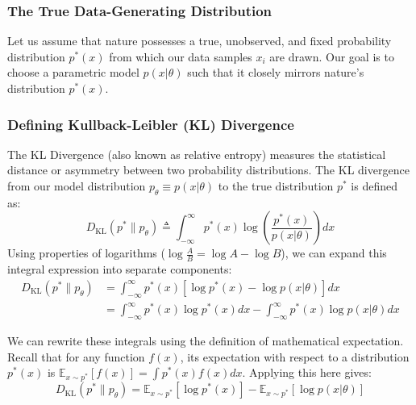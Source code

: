 \documentclass{article}
\begin{document}
\subsubsection{The True Data-Generating Distribution}
Let us assume that nature possesses a true, unobserved, and fixed probability distribution $p^*(x)$ from which our data samples $x_i$ are drawn. Our goal is to choose a parametric model $p(x|\theta)$ such that it closely mirrors nature's distribution $p^*(x)$.

\subsubsection{Defining Kullback-Leibler (KL) Divergence}
The KL Divergence (also known as relative entropy) measures the statistical distance or asymmetry between two probability distributions. The KL divergence from our model distribution $p_\theta \equiv p(x|\theta)$ to the true distribution $p^*$ is defined as:
\begin{equation}
D_{\text{KL}}(p^* \parallel p_\theta) \triangleq \int_{-\infty}^{\infty} p^*(x) \log \left( \frac{p^*(x)}{p(x|\theta)} \right) dx
\end{equation}
Using properties of logarithms ($\log \frac{A}{B} = \log A - \log B$), we can expand this integral expression into separate components:
\begin{align*}
D_{\text{KL}}(p^* \parallel p_\theta) &= \int_{-\infty}^{\infty} p^*(x) \left[ \log p^*(x) - \log p(x|\theta) \right] dx \\
&= \int_{-\infty}^{\infty} p^*(x) \log p^*(x) dx - \int_{-\infty}^{\infty} p^*(x) \log p(x|\theta) dx
\end{align*}

We can rewrite these integrals using the definition of mathematical expectation. Recall that for any function $f(x)$, its expectation with respect to a distribution $p^*(x)$ is $\mathbb{E}_{x \sim p^*}[f(x)] = \int p^*(x)f(x)dx$. Applying this here gives:
\begin{equation}
D_{\text{KL}}(p^* \parallel p_\theta) = \mathbb{E}_{x \sim p^*}\left[\log p^*(x)\right] - \mathbb{E}_{x \sim p^*}\left[\log p(x|\theta)\right]
\end{equation}
\end{document}
